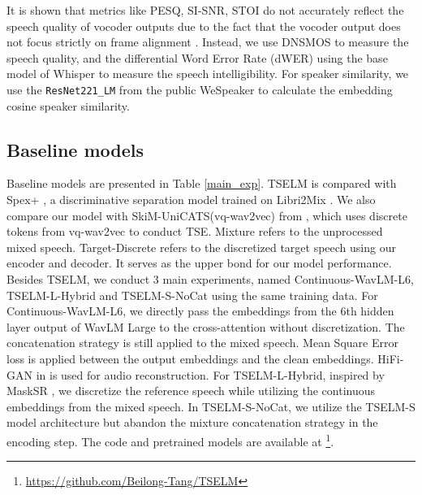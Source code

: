 \documentclass[conference]{IEEEtran}
\begin{document}
It is shown that metrics like PESQ, SI-SNR, STOI do not accurately reflect the speech quality of 
vocoder outputs due to the fact that the vocoder output does not focus strictly on frame alignment
\cite{tokensplit,selm}. Instead, we use DNSMOS \cite{dnsmos} to measure the speech quality, and the differential 
Word Error 
Rate (dWER) \cite{dwer} using the base model of Whisper \cite{whisper} to measure the speech intelligibility. For speaker similarity, we use the \texttt{ResNet221\_LM}
from the public WeSpeaker \cite{wespeaker} to calculate the embedding cosine speaker similarity.


\subsection{Baseline models}
Baseline models are presented in Table \ref{main_exp}. 
TSELM is compared with Spex+ \cite{spex_plus}, a discriminative separation model trained on Libri2Mix \cite{librimix}. 
We also compare our model with SkiM-UniCATS(vq-wav2vec) from \cite{gen_tse}, which uses discrete tokens from vq-wav2vec to conduct TSE. 
Mixture refers to the unprocessed mixed speech. 
Target-Discrete refers to the discretized target speech using our encoder and decoder. 
It serves as the upper bond for our model performance.  Besides TSELM, we conduct 3 main experiments, named
 Continuous-WavLM-L6, TSELM-L-Hybrid and TSELM-S-NoCat using the same training data. 
For Continuous-WavLM-L6, we directly
pass the embeddings from the 6th hidden layer output of WavLM Large to the cross-attention without discretization. 
The concatenation strategy is still applied to the mixed speech. Mean Square Error loss is applied between the output embeddings and the clean 
embeddings. HiFi-GAN in \cite{knn_vc} is used for audio reconstruction. For 
TSELM-L-Hybrid, inspired by MaskSR \cite{mask_sr}, we discretize the reference 
speech while utilizing the continuous embeddings from the mixed speech. In TSELM-S-NoCat, we utilize the TSELM-S model architecture but abandon the mixture concatenation strategy in the encoding step. The code and pretrained models are available at \footnote{\href{https://github.com/Beilong-Tang/TSELM}{https://github.com/Beilong-Tang/TSELM}}.
\end{document}
